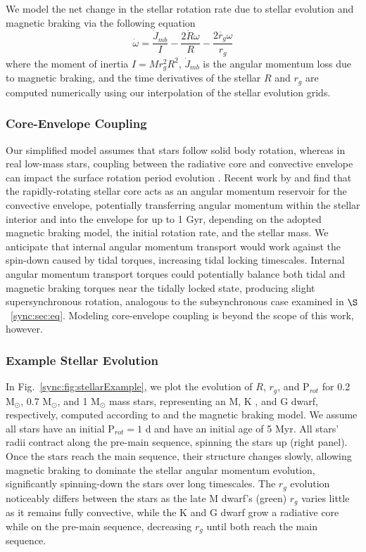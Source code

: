 We model the net change in the stellar rotation rate due to stellar evolution and magnetic braking via the following equation 
\begin{equation} \label{sync:eqn:stellar_rot_rate_dt}
\dot{\omega} = \frac{\dot{J}_{mb}}{I} - \frac{2 \dot{R} \omega}{R} - \frac{2 \dot{r_g} \omega}{r_g}
\end{equation}
where the moment of inertia $I = M r_g^2 R^2$, $\dot{J}_{mb}$ is the angular momentum loss due to magnetic braking, and the time derivatives of the stellar $R$ and $r_g$ are computed numerically using our interpolation of the \citet{Baraffe2015} stellar evolution grids.  

\subsubsection{Core-Envelope Coupling} \label{sync:sec:methods:twoLayer}

Our simplified model assumes that stars follow solid body rotation, whereas in real low-mass stars, coupling between the radiative core and convective envelope can impact the surface rotation period evolution \citep{MacGregor1991,Allain1998,Bouvier2008,Irwin2009}. Recent work by \citet{Gallet2013} and \citet{Gallet2015} find that the rapidly-rotating stellar core acts as an angular momentum reservoir for the convective envelope, potentially transferring angular momentum within the stellar interior and into the envelope for up to 1 Gyr, depending on the adopted magnetic braking model, the initial rotation rate, and the stellar mass. We anticipate that internal angular momentum transport would work against the spin-down caused by tidal torques, increasing tidal locking timescales. Internal angular momentum transport torques could potentially balance both tidal and magnetic braking torques near the tidally locked state, producing slight supersynchronous rotation, analogous to the subsynchronous case examined in $\S$~\ref{sync:sec:eq}. Modeling core-envelope coupling is beyond the scope of this work, however.

\subsubsection{Example Stellar Evolution} \label{sync:sec:methods:exampleStellar}

In Fig.~\ref{sync:fig:stellarExample}, we plot the evolution of $R$, $r_g$, and P$_{rot}$ for 0.2 M$_{\odot}$, 0.7 M$_{\odot}$, and 1 M$_{\odot}$ mass stars, representing an M, K , and G dwarf, respectively, computed according to \stellar and the \citet{Matt2015} magnetic braking model. We assume all stars have an initial P$_{rot} = 1$ d and have an initial age of 5 Myr. All stars' radii contract along the pre-main sequence, spinning the stars up (right panel). Once the stars reach the main sequence, their structure changes slowly, allowing magnetic braking to dominate the stellar angular momentum evolution, significantly spinning-down the stars over long timescales. The $r_g$ evolution noticeably differs between the stars as the late M dwarf's (green) $r_g$ varies little as it remains fully convective, while the K and G dwarf grow a radiative core while on the pre-main sequence, decreasing $r_g$ until both reach the main sequence.

